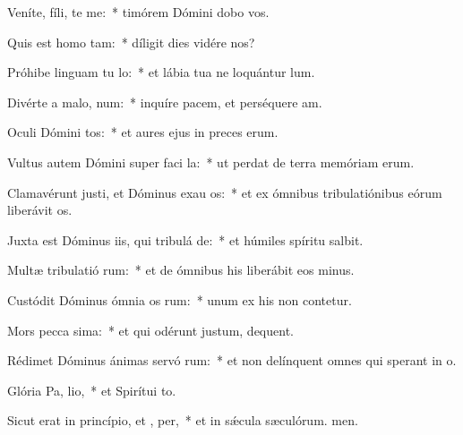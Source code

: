 \item Veníte, fíli, te me:~* timórem Dómini dobo vos.
\item Quis est homo   tam:~* díligit dies vidére nos?
\item Próhibe linguam tu  lo:~* et lábia tua ne loquántur lum.
\item Divérte a malo,   num:~* inquíre pacem, et perséquere am.
\item Oculi Dómini  tos:~* et aures ejus in preces erum.
\item Vultus autem Dómini super faci la:~* ut perdat de terra memóriam erum.
\item Clamavérunt justi, et Dóminus exau os:~* et ex ómnibus tribulatiónibus eórum liberávit os.
\item Juxta est Dóminus iis, qui tribulá  de:~* et húmiles spíritu salbit.
\item Multæ tribulatió rum:~* et de ómnibus his liberábit eos minus.
\item Custódit Dóminus ómnia os rum:~* unum ex his non contetur.
\item Mors pecca sima:~* et qui odérunt justum, dequent.
\item Rédimet Dóminus ánimas servó rum:~* et non delínquent omnes qui sperant in o.
\item Glória Pa,  lio,~* et Spirítui to.
\item Sicut erat in princípio, et ,  per,~* et in sǽcula sæculórum. men.
